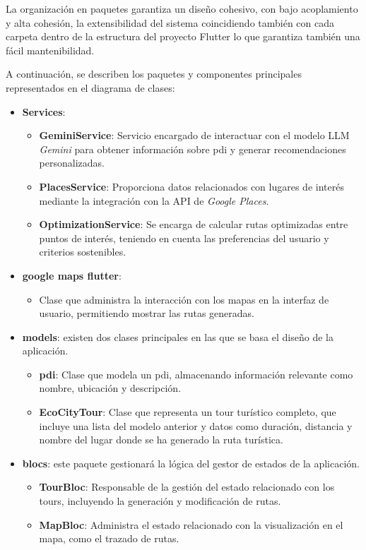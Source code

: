 La organización en paquetes garantiza un diseño cohesivo, con bajo acoplamiento y alta cohesión, la extensibilidad del sistema coincidiendo también con cada carpeta dentro de la estructura del proyecto Flutter lo que garantiza también una fácil mantenibilidad.


A continuación, se describen los paquetes y componentes principales representados en el diagrama de clases:

\begin{itemize}
	\item \textbf{Services}:
	\begin{itemize}
		\item \textbf{GeminiService}: Servicio encargado de interactuar con el modelo LLM \textit{Gemini} para obtener información sobre \acrlong{pdi} y generar recomendaciones personalizadas.
		\item \textbf{PlacesService}: Proporciona datos relacionados con lugares de interés mediante la integración con la API de \textit{Google Places}.
		\item \textbf{OptimizationService}: Se encarga de calcular rutas optimizadas entre puntos de interés, teniendo en cuenta las preferencias del usuario y criterios sostenibles.
	\end{itemize}
	
	\item \textbf{google maps flutter}:
	\begin{itemize}
		\item Clase que administra la interacción con los mapas en la interfaz de usuario, permitiendo mostrar las rutas generadas.
	\end{itemize}
	
	\item \textbf{models}: existen dos clases principales en las que se basa el diseño de la aplicación.
	\begin{itemize}
		\item \textbf{\acrlong{pdi}}: Clase que modela un \acrshort{pdi}, almacenando información relevante como nombre, ubicación y descripción. 
		\item \textbf{EcoCityTour}: Clase que representa un tour turístico completo, que incluye una lista del modelo anterior y datos como duración, distancia y nombre del lugar donde se ha generado la ruta turística.
	\end{itemize}
	
	\item \textbf{blocs}: este paquete gestionará la lógica del gestor de estados de la aplicación.
	\begin{itemize}
		\item \textbf{TourBloc}: Responsable de la gestión del estado relacionado con los tours, incluyendo la generación y modificación de rutas.
		\item \textbf{MapBloc}: Administra el estado relacionado con la visualización en el mapa, como el trazado de rutas.
	\end{itemize}
	

\end{itemize}
